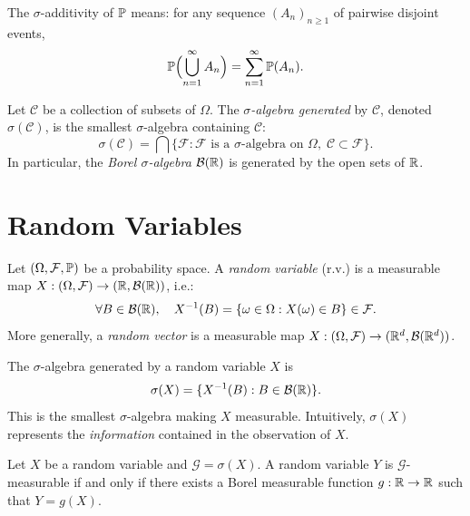 \begin{remark}
The $\sigma$-additivity of $\mathbb{P}$ means: for any sequence $(A_n)_{n \geq 1}$
of pairwise disjoint events,
\[
  \mathbb{P}\Bigl(\bigcup_{n=1}^{\infty} A_n\Bigr) = \sum_{n=1}^{\infty} \mathbb{P}(A_n).
\]
\end{remark}

\begin{definition}
Let $\mathcal{C}$ be a collection of subsets of $\Omega$. The \emph{$\sigma$-algebra
generated} by $\mathcal{C}$, denoted $\sigma(\mathcal{C})$, is the smallest
$\sigma$-algebra containing $\mathcal{C}$:
\[
  \sigma(\mathcal{C}) = \bigcap \bigl\{ \mathcal{F} : \mathcal{F} \text{ is a }
  \sigma\text{-algebra on } \Omega,\; \mathcal{C} \subset \mathcal{F} \bigr\}.
\]
In particular, the \emph{Borel $\sigma$-algebra} $\mathcal{B}(\mathbb{R})$ is generated
by the open sets of $\mathbb{R}$.
\end{definition}

\section{Random Variables}

\begin{definition}
Let $(\Omega, \mathcal{F}, \mathbb{P})$ be a probability space. A \emph{random variable}
(r.v.) is a measurable map $X : (\Omega, \mathcal{F}) \to (\mathbb{R}, \mathcal{B}(\mathbb{R}))$,
i.e.:
\[
  \forall B \in \mathcal{B}(\mathbb{R}), \quad X^{-1}(B) = \{\omega \in \Omega : X(\omega) \in B\} \in \mathcal{F}.
\]
More generally, a \emph{random vector} is a measurable map
$X : (\Omega, \mathcal{F}) \to (\mathbb{R}^d, \mathcal{B}(\mathbb{R}^d))$.
\end{definition}

\begin{definition}
The $\sigma$-algebra generated by a random variable $X$ is
\[
  \sigma(X) = \{X^{-1}(B) : B \in \mathcal{B}(\mathbb{R})\}.
\]
This is the smallest $\sigma$-algebra making $X$ measurable. Intuitively,
$\sigma(X)$ represents the \emph{information} contained in the observation of $X$.
\end{definition}

\begin{theorem}
\label{thm:doob_lemma}
Let $X$ be a random variable and $\mathcal{G} = \sigma(X)$. A random variable
$Y$ is $\mathcal{G}$-measurable if and only if there exists a Borel measurable
function $g : \mathbb{R} \to \mathbb{R}$ such that $Y = g(X)$.
\end{theorem}

